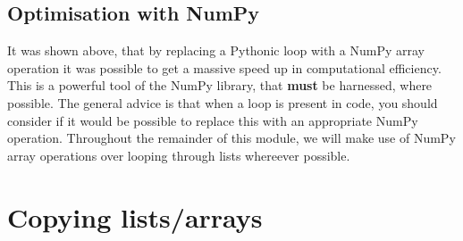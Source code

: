 \documentclass[a4paper]{article}
\begin{document}
\subsection{Optimisation with NumPy}

It was shown above, that by replacing a Pythonic loop with a NumPy array operation it was possible to get a massive speed up in computational efficiency.
This is a powerful tool of the NumPy library, that \textbf{must} be harnessed, where possible.
The general advice is that when a loop is present in code, you should consider if it would be possible to replace this with an appropriate NumPy operation.
Throughout the remainder of this module, we will make use of NumPy array operations over looping through lists whereever possible.
\vspace{\baselineskip}
\begin{center}
	\noindent{}
\end{center}

\section{Copying lists/arrays}
\end{document}
